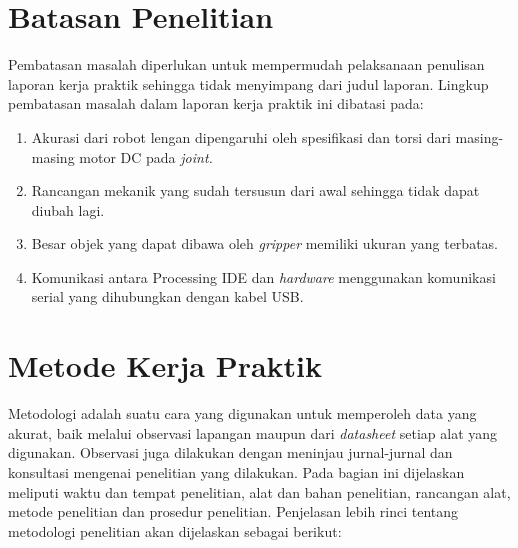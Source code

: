 \section{Batasan Penelitian}
Pembatasan masalah diperlukan untuk mempermudah pelaksanaan penulisan laporan kerja praktik sehingga tidak menyimpang dari judul laporan. Lingkup pembatasan masalah dalam laporan kerja praktik ini dibatasi pada:

\begin{enumerate}
	
	\item Akurasi dari robot lengan dipengaruhi oleh spesifikasi dan torsi dari masing-masing motor DC pada \emph{ joint.}
	\item  Rancangan mekanik yang sudah tersusun dari awal sehingga tidak dapat diubah lagi. 
	\item Besar objek yang dapat dibawa oleh \textit{gripper} memiliki ukuran yang terbatas.
	\item Komunikasi antara Processing IDE dan \textit{hardware} menggunakan komunikasi serial yang dihubungkan dengan kabel USB.
	
\end{enumerate}

\section{Metode Kerja Praktik}
Metodologi adalah suatu cara yang digunakan untuk memperoleh data yang akurat, baik melalui observasi lapangan maupun dari \emph {datasheet} setiap alat yang digunakan. Observasi juga dilakukan dengan meninjau jurnal-jurnal dan konsultasi mengenai penelitian yang dilakukan. Pada bagian ini dijelaskan meliputi waktu dan tempat penelitian, alat dan bahan penelitian, rancangan alat, metode penelitian dan prosedur penelitian. Penjelasan lebih rinci tentang metodologi penelitian akan dijelaskan sebagai berikut: 

